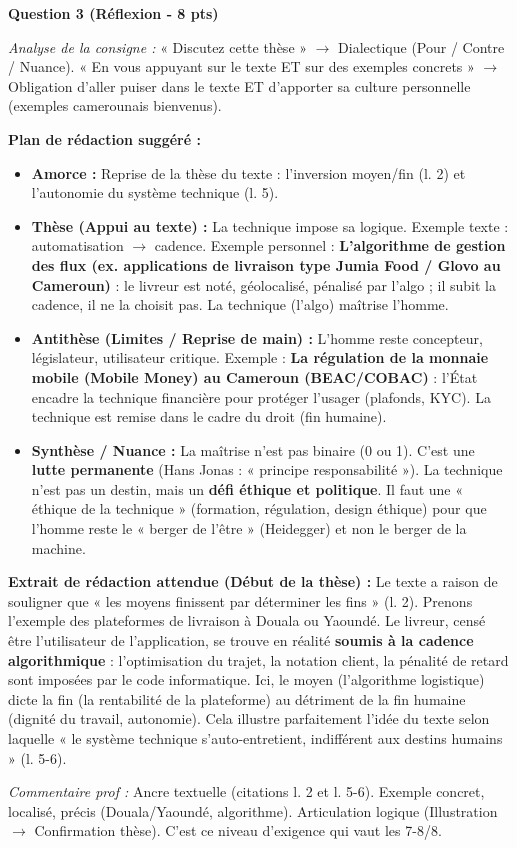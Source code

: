 \documentclass[11pt]{article}
\begin{document}
\begin{exoresolu}
\par\medskip\noindent\textbf{Question 3 (Réflexion - 8 pts)}
\par\medskip
\emph{Analyse de la consigne :} « Discutez cette thèse » $\rightarrow$ Dialectique (Pour / Contre / Nuance). « En vous appuyant sur le texte ET sur des exemples concrets » $\rightarrow$ Obligation d'aller puiser dans le texte ET d'apporter sa culture personnelle (exemples camerounais bienvenus).
\par\medskip
\textbf{Plan de rédaction suggéré :}
\begin{itemize}
    \item \textbf{Amorce :} Reprise de la thèse du texte : l'inversion moyen/fin (l. 2) et l'autonomie du système technique (l. 5).
    \item \textbf{Thèse (Appui au texte) :} La technique impose sa logique. Exemple texte : automatisation $\rightarrow$ cadence. Exemple personnel : \textbf{L'algorithme de gestion des flux (ex. applications de livraison type Jumia Food / Glovo au Cameroun)} : le livreur est noté, géolocalisé, pénalisé par l'algo ; il subit la cadence, il ne la choisit pas. La technique (l'algo) maîtrise l'homme.
    \item \textbf{Antithèse (Limites / Reprise de main) :} L'homme reste concepteur, législateur, utilisateur critique. Exemple : \textbf{La régulation de la monnaie mobile (Mobile Money) au Cameroun (BEAC/COBAC)} : l'État encadre la technique financière pour protéger l'usager (plafonds, KYC). La technique est remise dans le cadre du droit (fin humaine).
    \item \textbf{Synthèse / Nuance :} La maîtrise n'est pas binaire (0 ou 1). C'est une \textbf{lutte permanente} (Hans Jonas : « principe responsabilité »). La technique n'est pas un destin, mais un \textbf{défi éthique et politique}. Il faut une « éthique de la technique » (formation, régulation, design éthique) pour que l'homme reste le « berger de l'être » (Heidegger) et non le berger de la machine.
\end{itemize}

\par\medskip
\textbf{Extrait de rédaction attendue (Début de la thèse) :}
\og Le texte a raison de souligner que « les moyens finissent par déterminer les fins » (l. 2). Prenons l'exemple des plateformes de livraison à Douala ou Yaoundé. Le livreur, censé être l'utilisateur de l'application, se trouve en réalité \textbf{soumis à la cadence algorithmique} : l'optimisation du trajet, la notation client, la pénalité de retard sont imposées par le code informatique. Ici, le moyen (l'algorithme logistique) dicte la fin (la rentabilité de la plateforme) au détriment de la fin humaine (dignité du travail, autonomie). Cela illustre parfaitement l'idée du texte selon laquelle « le système technique s'auto-entretient, indifférent aux destins humains » (l. 5-6). \fg{}
\par\medskip
\emph{Commentaire prof :} Ancre textuelle (citations l. 2 et l. 5-6). Exemple concret, localisé, précis (Douala/Yaoundé, algorithme). Articulation logique (Illustration $\rightarrow$ Confirmation thèse). C'est ce niveau d'exigence qui vaut les 7-8/8.


\end{exoresolu}
\end{document}
